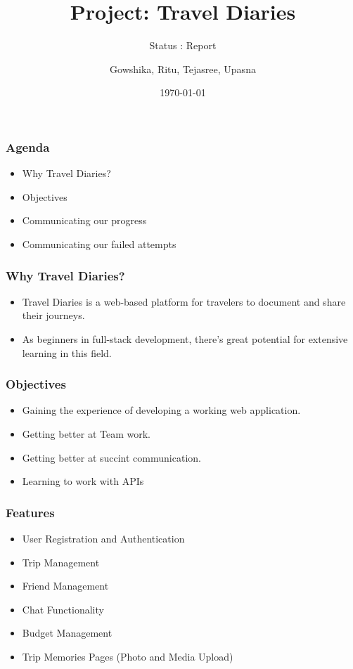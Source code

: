 \documentclass{beamer}
\title{Project: Travel Diaries}
\subtitle{Status : Report}
\author{Gowshika, Ritu, Tejasree, Upasna}
\date{\today}
\begin{document}
\frame{\titlepage}

\begin{frame}
    \frametitle{Agenda}
    \begin{itemize}
      \item Why Travel Diaries?
      \item Objectives
      \item Communicating our progress
      \item Communicating our failed attempts
    \end{itemize}
    \end{frame}

\begin{frame}
    \frametitle{Why Travel Diaries?}
    \begin{itemize}
        \item Travel Diaries is a web-based platform for travelers to document and share their journeys.
        \item As beginners in full-stack development, there's great potential for extensive learning in this field.
    \end{itemize}
\end{frame}

\begin{frame}
  \frametitle{Objectives}
  \begin{itemize}
    \item Gaining the experience of developing a working web application.
    \item Getting better at Team work.
    \item Getting better at succint communication.
    \item Learning to work with APIs
  \end{itemize}
\end{frame}

\begin{frame}
  \frametitle{Features}
  \begin{itemize}
    \item User Registration and Authentication
    \item Trip Management
    \item Friend Management
    \item Chat Functionality
    \item Budget Management
    \item Trip Memories Pages (Photo and Media Upload)
  \end{itemize}
\end{frame}
\end{document}
